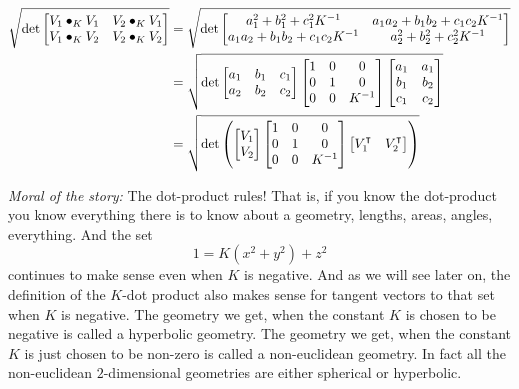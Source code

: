 \documentclass{ximera}
\begin{document}
\begin{problem}
\begin{freeResponse}
\begin{align*}
\sqrt{\det
\begin{bmatrix}
V_{1}\bullet_{K}V_{1} & V_{2}\bullet_{K}V_{1}\\
V_{1}\bullet_{K}V_{2} & V_{2}\bullet_{K}V_{2}%
\end{bmatrix}}
&=\sqrt{\det
\begin{bmatrix}
a^2_1 + b^2_1 + c^2_1K^{-1} & a_1a_2 + b_1b_2 + c_1c_2K^{-1}\\
a_1a_2 + b_1b_2 + c_1c_2K^{-1} & a^2_2 + b^2_2 + c^2_2K^{-1}%
\end{bmatrix}} \\
&= \sqrt{\det
\begin{bmatrix}
a_{1} & b_{1} & c_{1}\\
a_{2} & b_{2} & c_{2}
\end{bmatrix}
\begin{bmatrix}
1 & 0 & 0\\
0 & 1 & 0\\
0 & 0 & K^{-1}
\end{bmatrix}
\begin{bmatrix}
a_{1} & a_{1}  \\
b_{1} & b_{2}  \\
c_{1} &  c_{2}
\end{bmatrix}} \\
&= \sqrt{\det\left( 
\begin{bmatrix}
V_{1} \\
V_{2}
\end{bmatrix}
\begin{bmatrix}
1 & 0 & 0\\
0 & 1 & 0\\
0 & 0 & K^{-1}%
\end{bmatrix}
\begin{bmatrix}
V_{1}^\transpose & V_{2}^\transpose%
\end{bmatrix}
\right) }
\end{align*}
\end{freeResponse}

\end{problem}

\textit{Moral of the story:} The dot-product rules! That is, if you
know the dot-product you know everything there is to know about a
geometry, lengths, areas, angles, everything. And the set
\[
1=K\left(x^{2}+y^{2}\right)+z^{2} 
\]
continues to make sense even when $K$ is
negative. And as we will see later on, the definition of the $K$-dot
product also makes sense for tangent vectors to that set when $K$ is
negative. The geometry we get, when the constant $K$ is chosen to be
negative is called a hyperbolic geometry. The geometry we get, when
the constant $K$ is just chosen to be non-zero is called a
non-euclidean geometry.  In fact all the non-euclidean $2$-dimensional
geometries are either spherical or hyperbolic.
\end{document}
